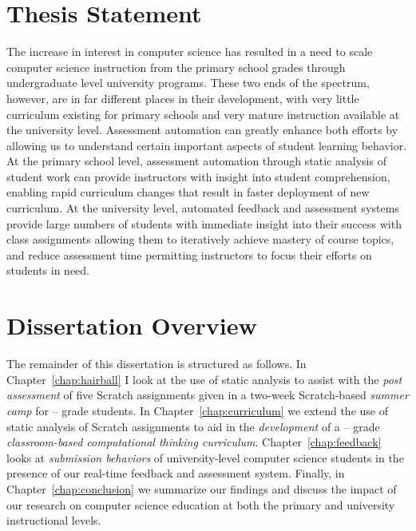 \section{Thesis Statement}
The increase in interest in computer science has resulted in a need to scale
computer science instruction from the primary school grades through
undergraduate level university programs. These two ends of the spectrum,
however, are in far different places in their development, with very little
curriculum existing for primary schools and very mature instruction available
at the university level. Assessment automation can greatly enhance both efforts
by allowing us to understand certain important aspects of student learning
behavior. At the primary school level, assessment automation through static
analysis of student work can provide instructors with insight into student
comprehension, enabling rapid curriculum changes that result in faster
deployment of new curriculum. At the university level, automated feedback and
assessment systems provide large numbers of students with immediate insight
into their success with class assignments allowing them to iteratively achieve
mastery of course topics, and reduce assessment time permitting instructors to
focus their efforts on students in need.

\section{Dissertation Overview}
The remainder of this dissertation is structured as follows. In
Chapter~\ref{chap:hairball} I look at the use of static analysis to assist with
the \emph{post assessment} of five Scratch assignments given in a two-week
Scratch-based \emph{summer camp} for -- grade students. In
Chapter~\ref{chap:curriculum} we extend the use of static analysis of Scratch
assignments to aid in the \emph{development} of a -- grade
\emph{classroom-based computational thinking
  curriculum}. Chapter~\ref{chap:feedback} looks at \emph{submission behaviors}
of university-level computer science students in the presence of our real-time
feedback and assessment system. Finally, in Chapter~\ref{chap:conclusion} we
summarize our findings and discuss the impact of our research on computer
science education at both the primary and university instructional levels.
